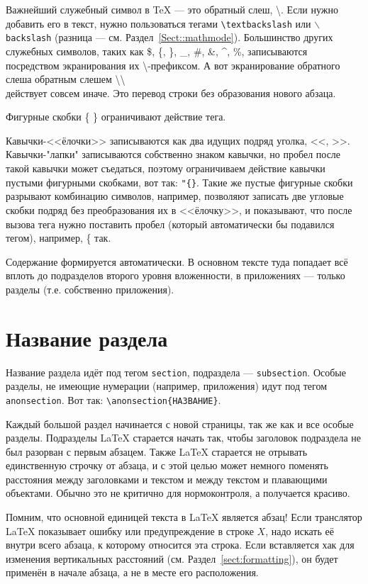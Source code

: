 \documentclass[14pt, russian]{scrartcl}
\begin{document}
Важнейший служебный символ в \TeX{} --- это обратный слеш, \textbackslash. Если нужно добавить его в текст, нужно пользоваться тегами \texttt{\textbackslash textbackslash} или \texttt{$\backslash$backslash} (разница --- см. Раздел~\ref{Sect::mathmode}). Большинство других служебных символов, таких как \$, \{, \}, \_, \#, \&, \^{}, \%, записываются посредством экранирования их  \textbackslash -префиксом. А вот экранирование обратного слеша обратным слешем \textbackslash \textbackslash{} \\ действует совсем иначе. Это перевод строки без образования нового абзаца.

Фигурные скобки \{ \} ограничивают действие тега. 

Кавычки-<<ёлочки>> записываются как два идущих подряд уголка, <{}<, >{}>. Кавычки-"лапки"{} записываются собственно знаком кавычки, но пробел после такой кавычки может съедаться, поэтому ограничиваем действие кавычки пустыми фигурными скобками, вот так: \texttt{"\{\}}. Такие же пустые фигурные скобки разрывают комбинацию символов, например, позволяют записать две угловые скобки подряд без преобразования их в <<ёлочку>>, и показывают, что после вызова тега нужно поставить пробел (который автоматически бы подавился тегом), например, \{{} так.

Содержание формируется автоматически. В основном тексте туда попадает всё вплоть до подразделов второго уровня вложенности, в приложениях --- только разделы (т.е. собственно приложения).

\section{Название раздела}

Название раздела идёт под тегом \texttt{section}, подраздела --- \texttt{subsection}. Особые разделы, не имеющие нумерации (например, приложения) идут под тегом \texttt{anonsection}. Вот так: \texttt{\textbackslash anonsection\{НАЗВАНИЕ\}}.

Каждый большой раздел начинается с новой страницы, так же как и все особые разделы. Подразделы \LaTeX{} старается начать так, чтобы заголовок подраздела не был разорван с первым абзацем. Также \LaTeX{} старается не отрывать единственную строчку от абзаца, и с этой целью может немного поменять расстояния между заголовками и текстом и между текстом и плавающими объектами. Обычно это не критично для нормоконтроля, а получается красиво.

Помним, что основной единицей текста в \LaTeX{} является абзац! Если транслятор \LaTeX{} показывает ошибку или предупреждение в строке $X$, надо искать её внутри всего абзаца, к которому относится эта строка. Если вставляется хак для изменения вертикальных расстояний (см. Раздел~\ref{sect:formatting}), он будет применён в начале абзаца, а не в месте его расположения.
\end{document}
